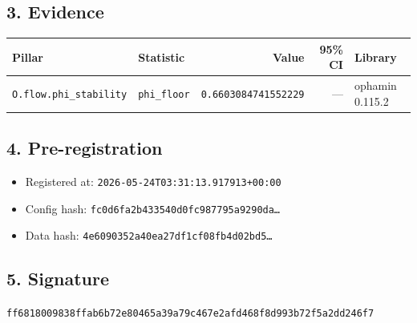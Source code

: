 \documentclass{article}
\begin{document}
\subsection*{3. Evidence}
\begin{tabular}{llrrl}\toprule
\textbf{Pillar} & \textbf{Statistic} & \textbf{Value} & \textbf{95\% CI} & \textbf{Library} \\\midrule
\texttt{O.flow.phi\_stability} & \texttt{phi\_floor} & \texttt{0.6603084741552229} & --- & ophamin 0.115.2 \\
\bottomrule\end{tabular}
\subsection*{4. Pre-registration}
\begin{itemize}
\item Registered at: \texttt{2026-05-24T03:31:13.917913+00:00}
\item Config hash: \texttt{fc0d6fa2b433540d0fc987795a9290da\dots}
\item Data hash: \texttt{4e6090352a40ea27df1cf08fb4d02bd5\dots}
\end{itemize}
\subsection*{5. Signature}
\texttt{ff6818009838ffab6b72e80465a39a79c467e2afd468f8d993b72f5a2dd246f7}\\
\end{document}
